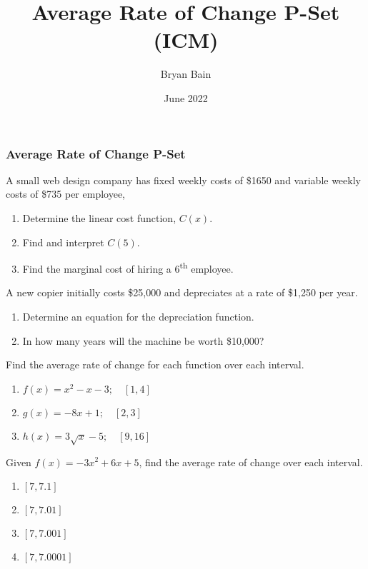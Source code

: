 \documentclass{article}
\title{Average Rate of Change P-Set (ICM)}
\author{Bryan Bain}
\date{June 2022}
\newcounter{pset}
\begin{document}
\subsubsection*{Average Rate of Change P-Set}

A small web design company has fixed weekly costs of \$1650 and variable weekly costs of \$735 per employee, 
\begin{enumerate}
    \item Determine the linear cost function, $C(x)$.
    \item Find and interpret $C(5)$.
    \item Find the marginal cost of hiring a 6\textsuperscript{th} employee.
\end{enumerate} \setcounter{pset}{\value{enumi}}

A new copier initially costs \$25,000 and depreciates at a rate of \$1,250 per year.
\begin{enumerate}   \setcounter{enumi}{\value{pset}}
    \item Determine an equation for the depreciation function.
    \item In how many years will the machine be worth \$10,000?
\end{enumerate} \setcounter{pset}{\value{enumi}}

Find the average rate of change for each function over each interval.
\begin{multicols}{3}
\begin{enumerate}   \setcounter{enumi}{\value{pset}}
    \item $f(x) = x^2 - x - 3; \quad [1,4]$
    \item $g(x) = -8x + 1; \quad [2,3]$
    \item $h(x) = 3\sqrt{x} - 5; \quad [9, 16]$
\end{enumerate}     \setcounter{pset}{\value{enumi}}
\end{multicols}

Given $f(x) = -3x^2 + 6x + 5$, find the average rate of change over each interval.
\begin{multicols}{4}
\begin{enumerate}   \setcounter{enumi}{\value{pset}}
    \item $[7,7.1]$
    \item $[7,7.01]$
    \item $[7,7.001]$
    \item $[7,7.0001]$
\end{enumerate}     \setcounter{pset}{\value{enumi}}
\end{multicols}
\end{document}

